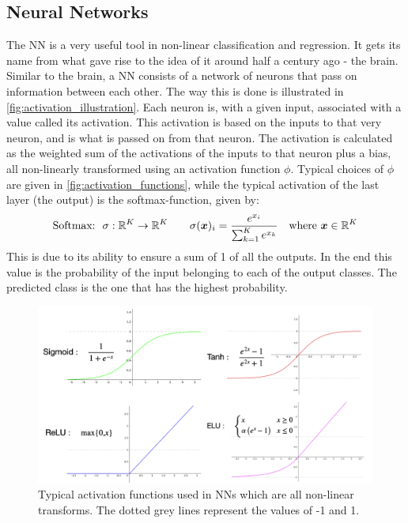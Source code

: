 \subsection{Neural Networks}\label{tex:theory_NN}
The NN is a very useful tool in non-linear classification and regression. It gets its name from what gave rise to the idea of it around half a century ago - the brain. Similar to the brain, a NN consists of a network of neurons that pass on information between each other. The way this is done is illustrated in \autoref{fig:activation_illustration}. Each neuron is, with a given input, associated with a value called its activation. This activation is based on the inputs to that very neuron, and is what is passed on from that neuron. The activation is calculated as the weighted sum of the activations of the inputs to that neuron plus a bias, all non-linearly transformed using an activation function $\phi$. Typical choices of $\phi$ are given in \autoref{fig:activation_functions}, while the typical activation of the last layer (the output) is the softmax-function, given by:
\begin{equation}
\text{Softmax:} \ \ \sigma: \mathbb{R}^K \rightarrow \mathbb{R}^K \qquad \sigma(\boldsymbol{x})_i = \frac{e^{x_i}}{\sum_{k=1}^K e^{x_k}} \quad \text{where} \ \boldsymbol{x} \in \mathbb{R}^K
\end{equation}
This is due to its ability to ensure a sum of 1 of all the outputs. In the end this value is the probability of the input belonging to each of the output classes. The predicted class is the one that has the highest probability.
\begin{figure}
    \centering
    \captionsetup{width=.95\linewidth}
    \includegraphics[width=.7\linewidth]{Pics/02_Theory/activation_functions.png}
    \caption{Typical activation functions used in NNs which are all non-linear transforms. The dotted grey lines represent the values of -1 and 1.}
    \label{fig:activation_functions}
\end{figure}

